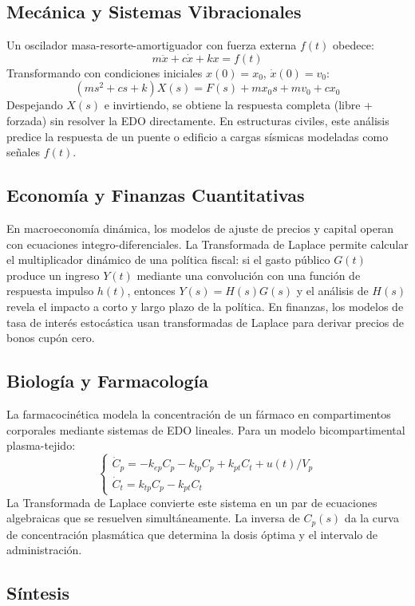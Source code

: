 \documentclass[12pt,letterpaper]{report}
\numberwithin{equation}{chapter}
\numberwithin{figure}{chapter}
\numberwithin{table}{chapter}
\begin{document}
\subsection{Mecánica y Sistemas Vibracionales}

Un oscilador masa-resorte-amortiguador con fuerza externa $f(t)$ obedece:
\[
m\ddot{x} + c\dot{x} + kx = f(t)
\]
Transformando con condiciones iniciales $x(0) = x_0$, $\dot{x}(0) = v_0$:
\[
(ms^2 + cs + k)X(s) = F(s) + mx_0 s + mv_0 + cx_0
\]
Despejando $X(s)$ e invirtiendo, se obtiene la respuesta completa (libre + forzada) sin resolver la EDO directamente. En estructuras civiles, este análisis predice la respuesta de un puente o edificio a cargas sísmicas modeladas como señales $f(t)$.

\subsection{Economía y Finanzas Cuantitativas}

En macroeconomía dinámica, los modelos de ajuste de precios y capital operan con ecuaciones integro-diferenciales. La Transformada de Laplace permite calcular el multiplicador dinámico de una política fiscal: si el gasto público $G(t)$ produce un ingreso $Y(t)$ mediante una convolución con una función de respuesta impulso $h(t)$, entonces $Y(s) = H(s)G(s)$ y el análisis de $H(s)$ revela el impacto a corto y largo plazo de la política. En finanzas, los modelos de tasa de interés estocástica usan transformadas de Laplace para derivar precios de bonos cupón cero.

\subsection{Biología y Farmacología}

La farmacocinética modela la concentración de un fármaco en compartimentos corporales mediante sistemas de EDO lineales. Para un modelo bicompartimental plasma-tejido:
\[
\begin{cases}
\dot{C}_p = -k_{ep}C_p - k_{tp}C_p + k_{pt}C_t + u(t)/V_p \\[4pt]
\dot{C}_t = k_{tp}C_p - k_{pt}C_t
\end{cases}
\]
La Transformada de Laplace convierte este sistema en un par de ecuaciones algebraicas que se resuelven simultáneamente. La inversa de $C_p(s)$ da la curva de concentración plasmática que determina la dosis óptima y el intervalo de administración.

\subsection{Síntesis}
\end{document}
